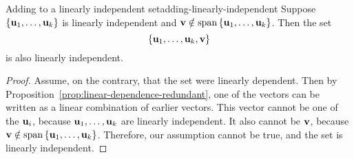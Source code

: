 \begin{proposition}{Adding to a linearly independent set}{adding-linearly-independent}
  Suppose $\left\{\mbox{\bf u}_{1},\ldots,\mbox{\bf u}_{k}\right\}$ is linearly
  independent and
  $\vect{v}\notin \sspan\set{\vect{u}_{1},\ldots,\vect{u}_{k}}$. Then
  the set
  \begin{equation*}
    \left\{\mbox{\bf u}_{1},\ldots,\mbox{\bf u}_{k},\mbox{\bf v}\right\}
  \end{equation*}
  is also linearly independent.
\end{proposition}

\begin{proof}
  Assume, on the contrary, that the set were linearly dependent. Then
  by Proposition~\ref{prop:linear-dependence-redundant}, one of the
  vectors can be written as a linear combination of earlier vectors.
  This vector cannot be one of the $\mbox{\bf u}_i$, because
  $\mbox{\bf u}_{1},\ldots,\mbox{\bf u}_{k}$ are linearly independent.  It
  also cannot be $\mbox{\bf v}$, because
  $\vect{v}\notin
  \sspan\set{\vect{u}_{1},\ldots,\vect{u}_{k}}$. Therefore, our
  assumption cannot be true, and the set is linearly independent.
\end{proof}
